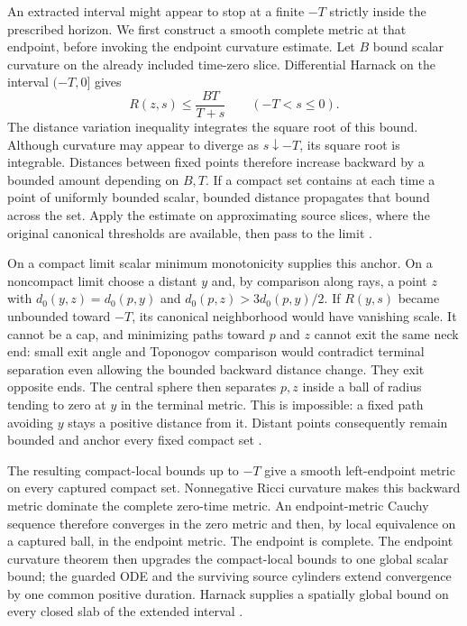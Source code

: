 An extracted interval might appear to stop at a finite $-T$ strictly
inside the prescribed horizon. We first construct a smooth complete metric
at that endpoint, before invoking the endpoint curvature estimate.
Let $B$ bound scalar curvature on the already included time-zero slice.
Differential Harnack on the interval $(-T,0]$ gives
\[
 R(z,s)\leq\frac{BT}{T+s}\qquad(-T<s\leq0).
\]
The distance variation inequality integrates the square root of this
bound. Although curvature may appear to diverge as $s\downarrow-T$,
its square root is integrable. Distances between fixed points therefore
increase backward by a bounded amount depending on $B,T$. If a compact
set contains at each time a point of uniformly bounded scalar, bounded
distance propagates that bound across the set. Apply the estimate on
approximating source slices, where the original canonical thresholds are
available, then pass to the limit
\cite[Lemma 11.11 and Claim 11.12, pp. 273--274]{MT2007}.

On a compact limit scalar minimum monotonicity supplies this anchor.
On a noncompact limit choose a distant $y$ and, by comparison along rays,
a point $z$ with $d_0(y,z)=d_0(p,y)$ and
$d_0(p,z)>3d_0(p,y)/2$. If $R(y,s)$ became unbounded toward $-T$,
its canonical neighborhood would have vanishing scale. It cannot be a
cap, and minimizing paths toward $p$ and $z$ cannot exit the same neck
end: small exit angle and Toponogov comparison would contradict terminal
separation even allowing the bounded backward distance change. They exit
opposite ends. The central sphere then separates $p,z$ inside a ball of
radius tending to zero at $y$ in the terminal metric. This is impossible:
a fixed path avoiding $y$ stays a positive distance from it. Distant
points consequently remain bounded and anchor every fixed compact set
\cite[Lemma 11.13--Corollary 11.16, pp. 275--277]{MT2007}.

The resulting compact-local bounds up to $-T$ give a smooth left-endpoint
metric on every captured compact set. Nonnegative Ricci curvature makes this
backward metric dominate the complete zero-time metric. An endpoint-metric
Cauchy sequence therefore converges in the zero metric and then, by local
equivalence on a captured ball, in the endpoint metric. The endpoint is
complete. The endpoint curvature theorem then upgrades the compact-local
bounds to one global scalar bound; the guarded ODE and the surviving source
cylinders extend convergence by one common positive duration. Harnack
supplies a spatially global bound on every closed slab of the extended
interval
\cite[Claim 11.17, pp. 277--278]{MT2007}.

